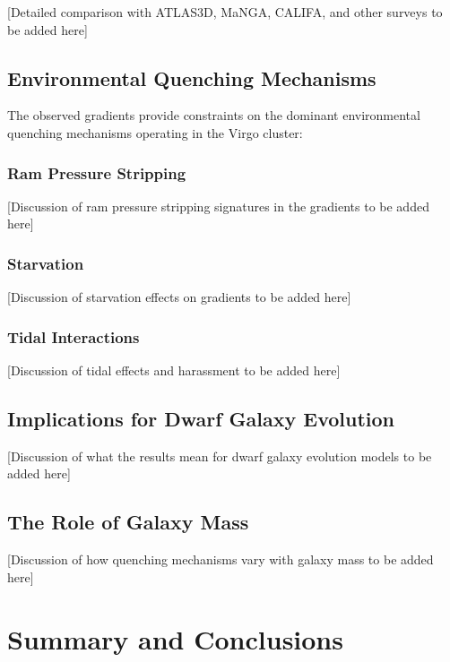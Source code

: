 \documentclass[linenumbers,trackchanges,twocolumn]{aastex631}
\begin{document}
[Detailed comparison with ATLAS3D, MaNGA, CALIFA, and other surveys to be added here]

\subsection{Environmental Quenching Mechanisms}

The observed gradients provide constraints on the dominant environmental quenching mechanisms operating in the Virgo cluster:

\subsubsection{Ram Pressure Stripping}
[Discussion of ram pressure stripping signatures in the gradients to be added here]

\subsubsection{Starvation}
[Discussion of starvation effects on gradients to be added here]

\subsubsection{Tidal Interactions}
[Discussion of tidal effects and harassment to be added here]

\subsection{Implications for Dwarf Galaxy Evolution}

[Discussion of what the results mean for dwarf galaxy evolution models to be added here]

\subsection{The Role of Galaxy Mass}

[Discussion of how quenching mechanisms vary with galaxy mass to be added here]

\section{Summary and Conclusions}
\end{document}
